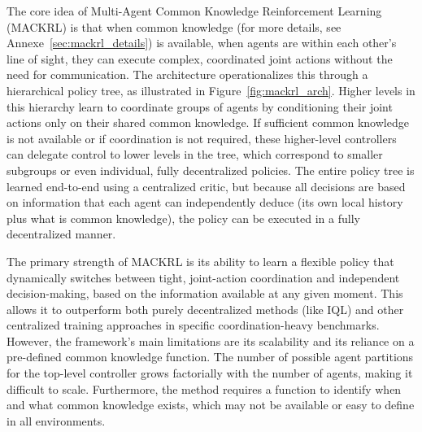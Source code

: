 The core idea of Multi-Agent Common Knowledge Reinforcement Learning (MACKRL) is that when common knowledge (for more details, see Annexe~\ref{sec:mackrl_details}) is available, when agents are within each other's line of sight, they can execute complex, coordinated joint actions without the need for communication. The architecture operationalizes this through a hierarchical policy tree, as illustrated in Figure~\ref{fig:mackrl_arch}. Higher levels in this hierarchy learn to coordinate groups of agents by conditioning their joint actions only on their shared common knowledge. If sufficient common knowledge is not available or if coordination is not required, these higher-level controllers can delegate control to lower levels in the tree, which correspond to smaller subgroups or even individual, fully decentralized policies. The entire policy tree is learned end-to-end using a centralized critic, but because all decisions are based on information that each agent can independently deduce (its own local history plus what is common knowledge), the policy can be executed in a fully decentralized manner.

The primary strength of MACKRL is its ability to learn a flexible policy that dynamically switches between tight, joint-action coordination and independent decision-making, based on the information available at any given moment. This allows it to outperform both purely decentralized methods (like IQL) \parencite{Independent_vs_Cooperative_Agents} and other centralized training approaches in specific coordination-heavy benchmarks. However, the framework's main limitations are its scalability and its reliance on a pre-defined common knowledge function. The number of possible agent partitions for the top-level controller grows factorially with the number of agents, making it difficult to scale. Furthermore, the method requires a function to identify when and what common knowledge exists, which may not be available or easy to define in all environments.



